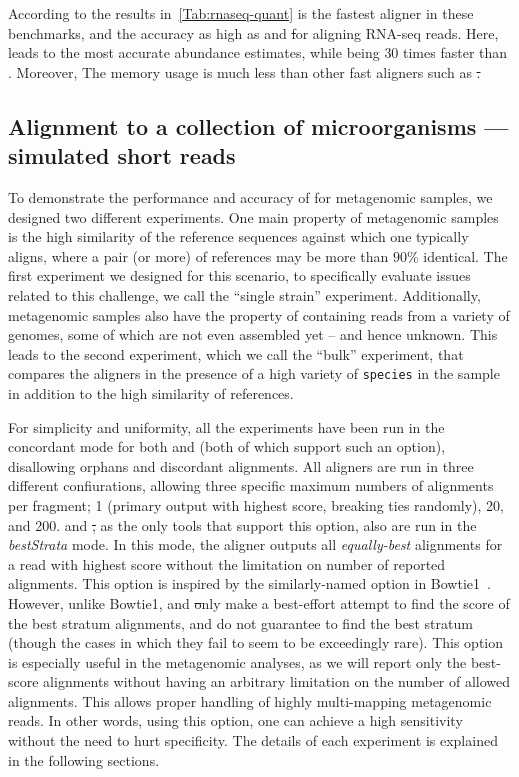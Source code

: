 According to the results in~\cref{Tab:rnaseq-quant} \puffaligner is the fastest aligner in these benchmarks, 
and the accuracy as high as \bt and \st for aligning RNA-seq reads.  Here, \puffaligner leads to the most 
accurate abundance estimates, while being $30$ times faster than \bt. Moreover, The memory usage is much 
less than other fast aligners such as \st.

\subsection{Alignment to a collection of microorganisms --- simulated short reads}

To demonstrate the performance and accuracy of \puffaligner for metagenomic samples, we designed two different 
experiments. One main property of metagenomic samples is the high similarity of the reference sequences against 
which one typically aligns, where a pair (or more) of references may be more than $90\%$ identical.
The first experiment we designed for this scenario, to specifically evaluate issues related to this challenge, 
we call the ``single strain'' experiment. Additionally, metagenomic samples also have the property of containing 
reads from a variety of genomes, some of which are not even assembled yet -- and hence unknown. This leads to 
the second experiment, which we call the ``bulk'' experiment, that compares the aligners in the presence of a 
high variety of \texttt{species} in the sample in addition to the high similarity of references.

For simplicity and uniformity, all the experiments have been run in the concordant mode for both \puffaligner 
and \bt (both of which support such an option), disallowing orphans and discordant alignments.
All aligners are run in three different confiurations, allowing three specific maximum numbers of alignments per 
fragment; 1 (primary output with highest score, breaking ties randomly), 20, and 200.
\puffaligner and \st, as the only tools that support this option, also are run in the \emph{bestStrata} mode.
In this mode, the aligner outputs all \emph{equally-best} alignments for a read with highest score without the 
limitation on number of reported alignments. This option is inspired by the similarly-named option in 
Bowtie1~\citep{langmead2010aligning}. However, unlike Bowtie1, \puffaligner and \st only make a best-effort 
attempt to find the score of the best stratum alignments, and do not guarantee to find the best stratum 
(though the cases in which they fail to seem to be exceedingly rare). This option is especially useful in 
the metagenomic analyses, as we will report only the best-score alignments without having an arbitrary 
limitation on the number of allowed alignments. This allows proper handling of highly multi-mapping 
metagenomic reads. In other words, using this option, one can achieve a high sensitivity without the need to 
hurt specificity. The details of each experiment is explained in the following sections.

